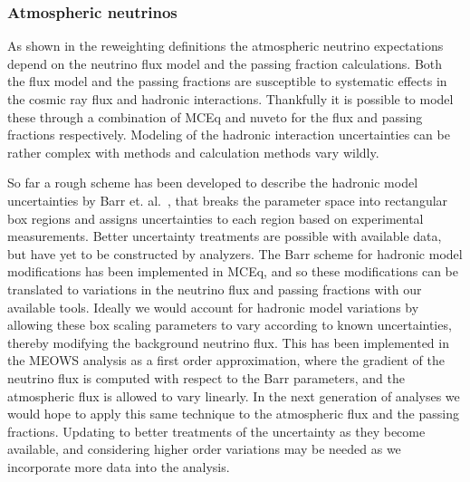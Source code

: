 \subsubsection{Atmospheric neutrinos}
As shown in the reweighting definitions the atmospheric neutrino expectations depend on the neutrino flux model and the passing fraction calculations.
Both the flux model and the passing fractions are susceptible to systematic effects in the cosmic ray flux and hadronic interactions.
Thankfully it is possible to model these through a combination of MCEq and nuveto for the flux and passing fractions respectively.
Modeling of the hadronic interaction uncertainties can be rather complex with methods and calculation methods vary wildly.

So far a rough scheme has been developed to describe the hadronic model uncertainties by Barr et. al.~\cite{Barr:2004br}, that breaks the parameter space into rectangular box regions and assigns uncertainties to each region based on experimental measurements.
Better uncertainty treatments are possible with available data, but have yet to be constructed by analyzers.
The Barr scheme for hadronic model modifications has been implemented in MCEq, and so these modifications can be translated to variations in the neutrino flux and passing fractions with our available tools.
Ideally we would account for hadronic model variations by allowing these box scaling parameters to vary according to known uncertainties, thereby modifying the background neutrino flux.
This has been implemented in the MEOWS analysis as a first order approximation, where the gradient of the neutrino flux is computed with respect to the Barr parameters, and the atmospheric flux is allowed to vary linearly.
In the next generation of analyses we would hope to apply this same technique to the atmospheric flux and the passing fractions.
Updating to better treatments of the uncertainty as they become available, and considering higher order variations may be needed as we incorporate more data into the analysis.

